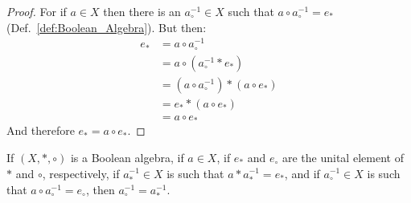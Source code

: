     \begin{proof}
        For if $a\in{X}$ then there is an $a_{\circ}^{\minus{1}}\in{X}$ such
        that $a\circ{a}_{\circ}^{\minus{1}}=e_{*}$
        (Def.~\ref{def:Boolean_Algebra}). But then:
        \begin{align}
            e_{*}&=a\circ{a}_{\circ}^{\minus{1}}
            \tag{Complement Property}\\
            &=a\circ(a_{\circ}^{\minus{1}}*e_{*})
            \tag{Identity}\\
            &=(a\circ{a}_{\circ}^{\minus{1}})*(a\circ{e}_{*})
            \tag{Distributivity}\\
            &=e_{*}*(a\circ{e}_{*})
            \tag{Complement Property}\\
            &=a\circ{e}_{*}
            \tag{Identity}
        \end{align}
        And therefore $e_{*}=a\circ{e}_{*}$.
    \end{proof}
    \begin{theorem}
        \label{thm:Bool_Comp_of_First_Op_is_Comp_of_Second_Op}
        If $(X,*,\circ)$ is a Boolean algebra, if $a\in{X}$, if
        $e_{*}$ and $e_{\circ}$ are the unital element of $*$ and $\circ$,
        respectively, if $a_{*}^{\minus{1}}\in{X}$ is such that
        $a*a_{*}^{\minus{1}}=e_{*}$, and if $a_{\circ}^{\minus{1}}\in{X}$ is
        such that $a\circ{a}_{\circ}^{\minus{1}}=e_{\circ}$, then
        $a_{\circ}^{\minus{1}}=a_{*}^{\minus{1}}$.
    \end{theorem}
